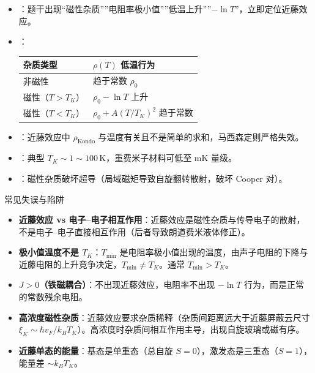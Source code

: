 \begin{tipbox}[快速识别与解题技巧]
\begin{itemize}
    \item {}：题干出现``磁性杂质''''电阻率极小值''''低温上升''''$-\ln T$''，立即定位近藤效应。
    \item {}：
    \begin{center}
    \begin{tabular}{ll}
    \toprule
    \textbf{杂质类型} & \textbf{$\rho(T)$ 低温行为} \\
    \midrule
    非磁性 & 趋于常数 $\rho_0$ \\
    磁性（$T>T_K$） & $\rho_0-\ln T$ 上升 \\
    磁性（$T<T_K$） & $\rho_0+A(T/T_K)^2$ 趋于常数 \\
    \bottomrule
    \end{tabular}
    \end{center}
    \item {}：近藤效应中 $\rho_{\text{Kondo}}$ 与温度有关且不是简单的求和，马西森定则严格失效。
    \item {}：典型 $T_K\sim1\sim100\,\text{K}$，重费米子材料可低至 mK 量级。
    \item {}：磁性杂质破坏超导（局域磁矩导致自旋翻转散射，破坏 Cooper 对）。
\end{itemize}
\end{tipbox}

\begin{errorbox}{常见失误与陷阱}
\begin{itemize}
    \item \textbf{近藤效应 vs 电子--电子相互作用}：近藤效应是磁性杂质与传导电子的散射，不是电子--电子直接相互作用（后者导致朗道费米液体修正）。
    \item \textbf{极小值温度不是 $T_K$}：$T_{\min}$ 是电阻率极小值出现的温度，由声子电阻的下降与近藤电阻的上升竞争决定，$T_{\min}\neq T_K$。通常 $T_{\min}>T_K$。
    \item \textbf{$J>0$（铁磁耦合）}：不出现近藤效应，电阻率不出现 $-\ln T$ 行为，而是正常的常数残余电阻。
    \item \textbf{高浓度磁性杂质}：近藤效应要求杂质稀释（杂质间距离远大于近藤屏蔽云尺寸 $\xi_K\sim\hbar v_F/k_BT_K$）。高浓度时杂质间相互作用主导，出现自旋玻璃或磁有序。
    \item \textbf{近藤单态的能量}：基态是单重态（总自旋 $S=0$），激发态是三重态（$S=1$），能量差 $\sim k_BT_K$。
\end{itemize}
\end{errorbox}

